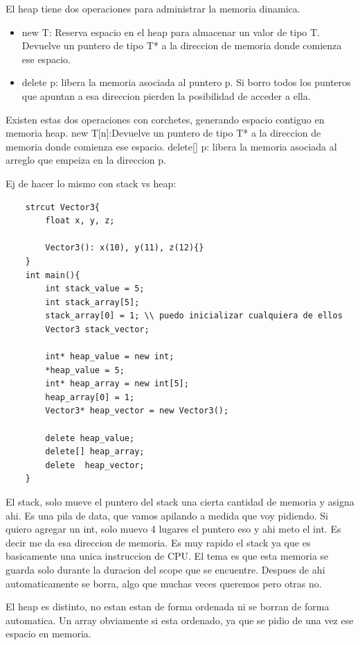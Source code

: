 \documentclass[11pt]{article}
\begin{document}
El heap tiene dos operaciones para administrar la memoria dinamica.
\begin{itemize}
    \item new T: Reserva espacio en el heap para almacenar un valor
        de tipo T. Devuelve un puntero de tipo T* a la direccion de memoria
        donde comienza ese espacio.
    \item delete p: libera la memoria asociada al puntero p.
        Si borro todos los punteros que apuntan a esa direccion pierden la posibilidad
        de acceder a ella.
\end{itemize}

Existen estas dos operaciones con corchetes, generando espacio contiguo en memoria heap.
new T[n]:Devuelve un puntero de tipo T* a la direccion de memoria donde comienza ese espacio.
delete[] p: libera la memoria asociada al arreglo que empeiza en la  direccion p.

Ej de hacer lo mismo con stack vs heap:
\begin{lstlisting}
    strcut Vector3{
        float x, y, z;

        Vector3(): x(10), y(11), z(12){}
    }
    int main(){
        int stack_value = 5;
        int stack_array[5];
        stack_array[0] = 1; \\ puedo inicializar cualquiera de ellos
        Vector3 stack_vector;

        int* heap_value = new int;
        *heap_value = 5;
        int* heap_array = new int[5];
        heap_array[0] = 1;
        Vector3* heap_vector = new Vector3();

        delete heap_value;
        delete[] heap_array;
        delete  heap_vector;
    }
\end{lstlisting}

El stack, solo mueve el puntero del stack una cierta cantidad de memoria y
asigna ahi.
Es una pila de data, que vamos apilando a medida que voy pidiendo.
Si quiero agregar un int, solo muevo 4 lugares el puntero eso y ahi meto el int.
Es decir me da esa direccion de memoria.
Es muy rapido el stack ya que es basicamente una unica instruccion de CPU.
El tema es que esta memoria se guarda solo durante la duracion del scope que se
encuentre.
Despues de ahi automaticamente se borra, algo que muchas veces queremos
pero otras no.

El heap es distinto, no estan estan de forma ordenada ni se borran de forma
automatica.
Un array obviamente si esta ordenado, ya que se pidio de una vez ese espacio en memoria.
\end{document}
